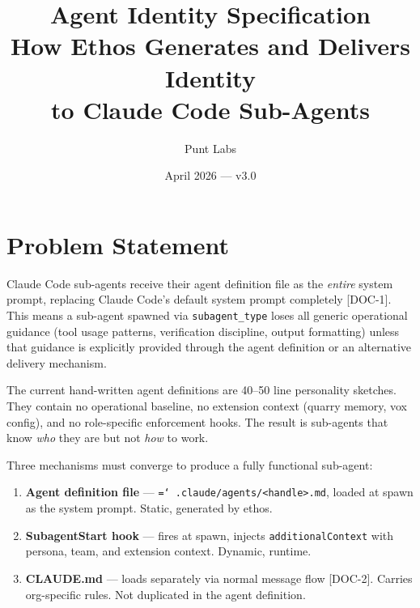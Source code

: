 \documentclass[a4paper,10pt]{article}
\newcommand{\fpath}[1]{\texttt{\hyphenchar\font=`\/ #1}}
\newcommand{\field}[1]{\texttt{#1}}
\newcommand{\coderef}[1]{\textsf{\small [#1]}}
\begin{document}
\title{Agent Identity Specification\\
\large How Ethos Generates and Delivers Identity\\
to Claude Code Sub-Agents}
\author{Punt Labs}
\date{April 2026 --- v3.0}
\maketitle

\tableofcontents
\newpage

\section{Problem Statement}

Claude Code sub-agents receive their agent definition file as the
\emph{entire} system prompt, replacing Claude Code's default system
prompt completely \coderef{DOC-1}. This means a sub-agent spawned
via \field{subagent\_type} loses all generic operational guidance
(tool usage patterns, verification discipline, output formatting)
unless that guidance is explicitly provided through the agent
definition or an alternative delivery mechanism.

The current hand-written agent definitions are 40--50 line
personality sketches. They contain no operational baseline, no
extension context (quarry memory, vox config), and no role-specific
enforcement hooks. The result is sub-agents that know \emph{who}
they are but not \emph{how} to work.

Three mechanisms must converge to produce a fully functional
sub-agent:

\begin{enumerate}
  \item \textbf{Agent definition file} ---
    \fpath{.claude/agents/<handle>.md}, loaded at spawn as the system
    prompt. Static, generated by ethos.
  \item \textbf{SubagentStart hook} --- fires at spawn, injects
    \field{additionalContext} with persona, team, and extension
    context. Dynamic, runtime.
  \item \textbf{CLAUDE.md} --- loads separately via normal message
    flow \coderef{DOC-2}. Carries org-specific rules. Not duplicated
    in the agent definition.
\end{enumerate}
\end{document}
